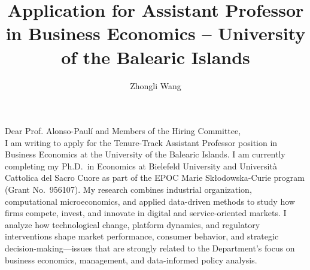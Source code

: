 \documentclass{nfr}
\title{Application for Assistant Professor in Business Economics – University of the Balearic Islands}
\author{Zhongli Wang}
\begin{document}

% 
% 
% 
% 


\maketitle


\noindent Dear Prof. Alonso-Paulí and Members of the Hiring Committee,\\[0.2cm]

I am writing to apply for the Tenure-Track Assistant Professor position in Business Economics at the University of the Balearic Islands. I am currently completing my Ph.D.\ in Economics at Bielefeld University and Università Cattolica del Sacro Cuore as part of the EPOC Marie Skłodowska-Curie program (Grant No.~956107). My research combines industrial organization, computational microeconomics, and applied data-driven methods to study how firms compete, invest, and innovate in digital and service-oriented markets. I analyze how technological change, platform dynamics, and regulatory interventions shape market performance, consumer behavior, and strategic decision-making—issues that are strongly related to the Department’s focus on business economics, management, and data-informed policy analysis.\\
\end{document}
